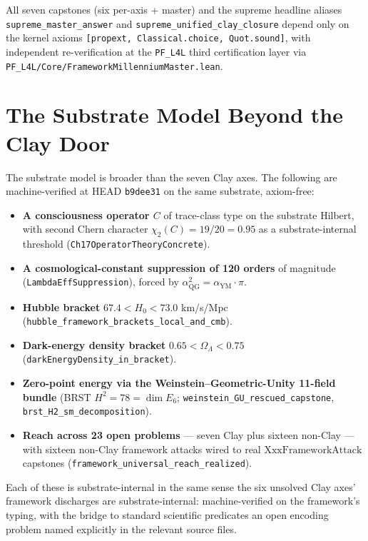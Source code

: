 \documentclass[11pt,a4paper]{article}
\theoremstyle{plain}
\theoremstyle{definition}
\theoremstyle{remark}
\newcommand{\aYM}{\alpha_{\mathrm{YM}}}
\newcommand{\aQG}{\alpha_{\mathrm{QG}}}
\newcommand{\code}[1]{\texttt{#1}}
\begin{document}
All seven capstones (six per-axis + master) and the supreme
headline aliases
\code{supreme\_master\_answer} and
\code{supreme\_unified\_clay\_closure} depend only on the kernel
axioms \texttt{[propext, Classical.choice, Quot.sound]}, with
independent re-verification at the
\code{PF\_L4L} third certification layer via
\code{PF\_L4L/Core/FrameworkMillenniumMaster.lean}.

\section{The Substrate Model Beyond the Clay Door}
\label{sec:cargo}

The substrate model is broader than the seven Clay axes. The
following are machine-verified at HEAD \code{b9dee31} on the
same substrate, axiom-free:

\begin{itemize}
\item \textbf{A consciousness operator $C$} of trace-class type
on the substrate Hilbert, with second Chern character
$\chi_{2}(C) = 19/20 = 0.95$ as a substrate-internal threshold
(\code{Ch17OperatorTheoryConcrete}).
\item \textbf{A cosmological-constant suppression of 120
orders} of magnitude (\code{LambdaEffSuppression}), forced by
$\aQG^{2} = \aYM \cdot \pi$.
\item \textbf{Hubble bracket} $67.4 < H_{0} < 73.0$ km/s/Mpc
(\code{hubble\_framework\_brackets\_local\_and\_cmb}).
\item \textbf{Dark-energy density bracket} $0.65 < \Omega_{\Lambda} < 0.75$
(\code{darkEnergyDensity\_in\_bracket}).
\item \textbf{Zero-point energy via the Weinstein--Geometric-Unity
11-field bundle} (BRST $H^{2} = 78 = \dim E_{6}$;
\code{weinstein\_GU\_rescued\_capstone},
\code{brst\_H2\_sm\_decomposition}).
\item \textbf{Reach across 23 open problems} --- seven Clay
plus sixteen non-Clay --- with sixteen non-Clay framework
attacks wired to real $\mathrm{XxxFrameworkAttack}$ capstones
(\code{framework\_universal\_reach\_realized}).
\end{itemize}

Each of these is substrate-internal in the same sense the
six unsolved Clay axes' framework discharges are
substrate-internal: machine-verified on the framework's typing,
with the bridge to standard scientific predicates an open
encoding problem named explicitly in the relevant source files.
\end{document}
